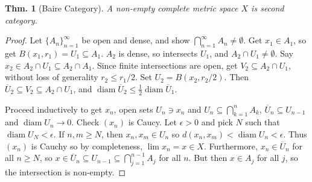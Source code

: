 \documentclass[12pt, a4paper]{book}
\DeclareMathOperator{\diam}{diam}
\newtheorem{theorem}{Thm.}[section]
\theoremstyle{nonumberplain}
\newtheorem{proof}{Proof}
\begin{document}
\begin{theorem}[Baire Category]
    A non-empty complete metric space $X$ is second category.
\end{theorem}
\begin{proof}
    Let $\{A_n\}_{n=1}^\infty$ be open and dense, and show $\bigcap_{n=1}^\infty A_n\neq\emptyset$.
    Get $x_1\in A_1$, so get $B(x_1,r_1)=U_1\subseteq A_1$.
    $A_2$ is dense, so intersects $U_1$, and $A_2\cap U_1\neq\emptyset$.
    Say $x_2\in A_2\cap U_1\subseteq A_2\cap A_1$.
    Since finite intersections are open, get $V_2\subseteq A_2\cap U_1$, without loss of generality $r_2\leq r_1/2$.
    Set $U_2=B(x_2,r_2/2)$.
    Then $\overline{U}_2\subseteq V_2\subseteq A_2\cap U_1$, and $\diam\overline{U}_2\leq\frac{1}{2}\diam\overline{U}_1$.

    Proceed inductively to get $x_n$, open sets $U_n\ni x_n$ and $U_n\subseteq\bigcap_{k=1}^n A_k$, $\overline{U}_n\subseteq U_{n-1}$ and $\diam U_n\to 0$.
    Check $(x_n)$ is Caucy.
    Let $\epsilon>0$ and pick $N$ such that $\diam U_N<\epsilon$.
    If $n,m\geq N$, then $x_n,x_m\in U_n$ so $d(x_n,x_m)<\diam U_n<\epsilon$.
    Thus $(x_n)$ is Cauchy so by completeness, $\lim x_n=x\in X$.
    Furthermore, $x_n\in\overline{U}_n$ for all $n\geq N$, so $x\in\overline{U}_n\subseteq U_{n-1}\subseteq\bigcap_{j=1}^{n-1}A_j$ for all $n$.
    But then $x\in A_j$ for all $j$, so the intersection is non-empty.
\end{proof}
\end{document}
